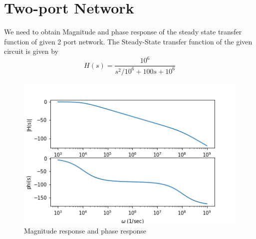 \documentclass[11pt, a4paper]{article}
\begin{document}
\section{Two-port Network}
We need to obtain Magnitude and phase response of the steady state transfer function of given 2 port network.
The Steady-State transfer function of the given circuit is given by
\begin{equation}
    H(s) = \frac{10^6}{s^2/10^6 + 100s + 10^6}
\end{equation}
  \begin{figure}[!tbh]
    \centering
    \includegraphics[scale=0.5]{Bodeplot.png}  
    \caption{Magnitude response and phase response} 
    \label{fig:fig10}
  \end{figure}
\end{document}
